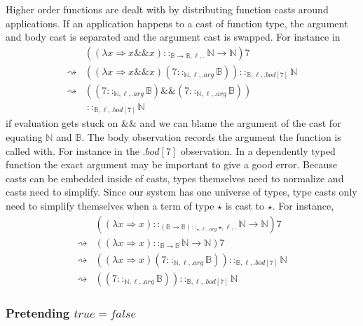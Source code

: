  Higher order functions are dealt with by distributing function casts
around applications. If an application happens to a cast of function
type, the argument and body cast is separated and the argument cast
is swapped. For instance in 
\begin{align*}
\, & \left(\left(\lambda x\Rightarrow x\&\&x\right)::_{\mathbb{B}\rightarrow\mathbb{B},\ell,.}\mathbb{N}\rightarrow\mathbb{N}\right)7\\
\rightsquigarrow & \left(\left(\lambda x\Rightarrow x\&\&x\right)\left(7::_{\mathbb{N},\ell,.arg}\mathbb{B}\right)\right)::_{\mathbb{B},\ell,.bod[7]}\mathbb{N}\\
\rightsquigarrow & \left(\left(7::_{\mathbb{N},\ell,.arg}\mathbb{B}\right)\&\&\left(7::_{\mathbb{N},\ell,.arg}\mathbb{B}\right)\right)\\
\, & \ ::_{\mathbb{B},\ell,.bod[7]}\mathbb{N}
\end{align*}
if evaluation gets stuck on $\&\&$ and we can blame the argument
of the cast for equating $\mathbb{N}$ and $\mathbb{B}$. The body
observation records the argument the function is called with. For
instance in the $.bod[7]$ observation. In a dependently typed function
the exact argument may be important to give a good error. Because
casts can be embedded inside of casts, types themselves need to normalize
and casts need to simplify. Since our system has one universe of types,
type casts only need to simplify themselves when a term of type $\star$
is cast to $\star$. For instance, 
\begin{align*}
\, & \left(\left(\lambda x\Rightarrow x\right)::_{\left(\mathbb{B}\rightarrow\mathbb{B}\right)::_{\star,\ell,.arg}\star,\ell,.}\mathbb{N}\rightarrow\mathbb{N}\right)7\\
\rightsquigarrow & \left(\left(\lambda x\Rightarrow x\right)::_{\mathbb{B}\rightarrow\mathbb{B}}\mathbb{N}\rightarrow\mathbb{N}\right)7\\
\rightsquigarrow & \left(\left(\lambda x\Rightarrow x\right)\left(7::_{\mathbb{N},\ell,.arg}\mathbb{B}\right)\right)::_{\mathbb{B},\ell,.bod[7]}\mathbb{N}\\
\rightsquigarrow & \left(\left(7::_{\mathbb{N},\ell,.arg}\mathbb{B}\right)\right)::_{\mathbb{B},\ell,.bod[7]}\mathbb{N}
\end{align*}


\subsubsection{Pretending $true=false$}

